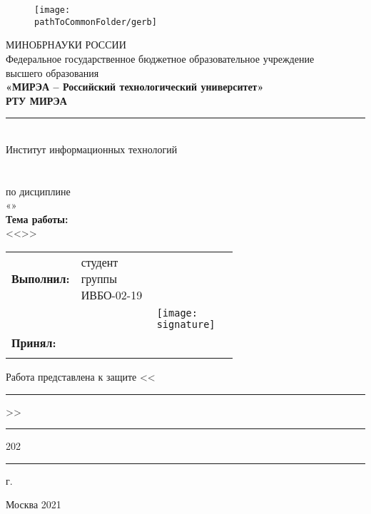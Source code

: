 

\begin{center}
	\begin{figure}[h!]
		\begin{center}
			\vspace{-10ex}
		\texttt{[image: \\pathToCommonFolder/gerb]}
		\end{center}
	\end{figure}
 	\small	МИНОБРНАУКИ РОССИИ \\
	Федеральное государственное бюджетное образовательное учреждение\\
						высшего образования\\
\normalsize					
\textbf{«МИРЭА – Российский технологический университет»\\
						РТУ МИРЭА}\\
						\noindent\rule{1\linewidth}{1pt}\\
       Институт информационных технологий\\ %
					\kafedra\\
		\vspace{3ex}
			\large \textbf{\workname}  \\
						по дисциплине\\ «\discipline» \\
		\vspace{3ex}
		\if \withouttheme
			\textbf{Тема работы:}\\ <<\theme>>
		\fi
\vspace{6ex}
\small
\begin{table}[h!]
\begin{tabular}{lp{0.43\linewidth}p{0.2\linewidth}l}
	\textbf{Выполнил:} & студент группы ИВБО-02-19 & \\ 
	& & %
		\hfill \texttt{[image: \\signature]} &

	 \studentfio \\%
	\textbf{Принял:} & \rang & \\
	& & & \hfill \teacherfio\\
\end{tabular}
\end{table}
\end{center}
\begin{flushleft}
Работа представлена к защите <<\rule{3ex}{1pt}>>\rule{10ex}{1pt} 202\rule{1ex}{1pt} г.\hfill
\end{flushleft}
\normalsize
\begin{center}
	\vfill
Москва 2021
\end{center}
